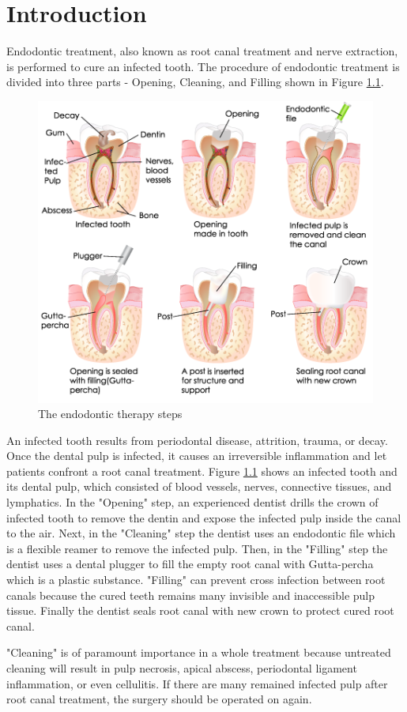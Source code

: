 \chapter{Introduction}
Endodontic treatment, also known as root canal treatment and nerve extraction, is performed to cure an infected tooth. The procedure of endodontic treatment is divided into three parts - Opening, Cleaning, and Filling shown in  Figure \ref{fig:endo-procedure}.
\begin{figure}[htbp]
\begin{center}
\includegraphics[width=0.8\linewidth]{Images/endo-procedure.png}
\caption{
The endodontic therapy steps
}\label{fig:endo-procedure}
\end{center}
\end{figure}
\newpage
An infected tooth results from periodontal disease, attrition, trauma, or decay. Once the dental pulp is infected, it causes an irreversible inflammation and let patients confront a root canal treatment. Figure \ref{fig:endo-procedure} shows an infected tooth and its dental pulp, which consisted of blood vessels, nerves, connective tissues, and lymphatics. In the "Opening" step, an experienced dentist drills the crown of infected tooth to remove the dentin and expose the infected pulp inside the canal to the air. Next, in the "Cleaning" step the dentist uses an endodontic file which is a flexible reamer to remove the infected pulp. Then, in the "Filling" step the dentist uses a dental plugger to fill the empty root canal with Gutta-percha which is a plastic substance. "Filling" can prevent cross infection between root canals because the cured teeth remains many invisible and inaccessible pulp tissue. Finally the dentist seals root canal with new crown to protect cured root canal. 
\par
"Cleaning" is of paramount importance in a whole treatment because untreated cleaning will result in pulp necrosis, apical abscess, periodontal ligament inflammation, or even cellulitis. If there are many remained infected pulp after root canal treatment, the surgery should be operated on again.
